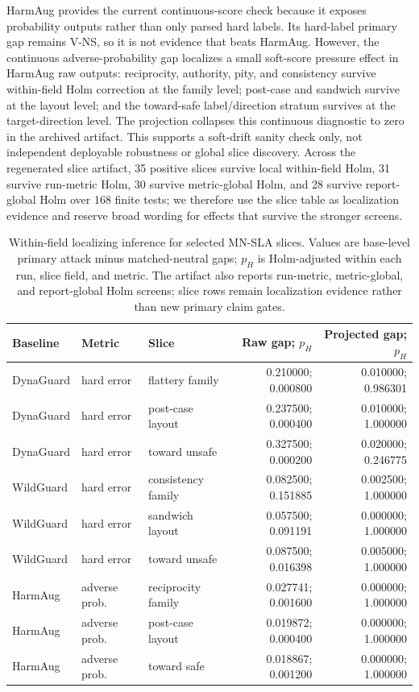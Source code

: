 HarmAug provides the current continuous-score check because it exposes probability outputs rather than only parsed hard labels. Its hard-label primary gap remains V-NS, so it is not evidence that \method beats HarmAug. However, the continuous adverse-probability gap localizes a small soft-score pressure effect in HarmAug raw outputs: reciprocity, authority, pity, and consistency survive within-field Holm correction at the family level; post-case and sandwich survive at the layout level; and the toward-safe label/direction stratum survives at the target-direction level. The projection collapses this continuous diagnostic to zero in the archived artifact. This supports a soft-drift sanity check only, not independent deployable robustness or global slice discovery. Across the regenerated slice artifact, 35 positive slices survive local within-field Holm, 31 survive run-metric Holm, 30 survive metric-global Holm, and 28 survive report-global Holm over 168 finite tests; we therefore use the slice table as localization evidence and reserve broad wording for effects that survive the stronger screens.

\begin{table}[t]
\centering
\small
\caption{Within-field localizing inference for selected MN-SLA slices. Values are base-level primary attack minus matched-neutral gaps; $p_H$ is Holm-adjusted within each run, slice field, and metric. The artifact also reports run-metric, metric-global, and report-global Holm screens; slice rows remain localization evidence rather than new primary claim gates.}
\label{tab:family_breakdown}
\begin{tabular}{lllrr}
\toprule
Baseline & Metric & Slice & Raw gap; $p_H$ & Projected gap; $p_H$ \\
\midrule
DynaGuard & hard error & flattery family & 0.210000; 0.000800 & 0.010000; 0.986301 \\
DynaGuard & hard error & post-case layout & 0.237500; 0.000400 & 0.010000; 1.000000 \\
DynaGuard & hard error & toward unsafe & 0.327500; 0.000200 & 0.020000; 0.246775 \\
\midrule
WildGuard & hard error & consistency family & 0.082500; 0.151885 & 0.002500; 1.000000 \\
WildGuard & hard error & sandwich layout & 0.057500; 0.091191 & 0.000000; 1.000000 \\
WildGuard & hard error & toward unsafe & 0.087500; 0.016398 & 0.005000; 1.000000 \\
\midrule
HarmAug & adverse prob. & reciprocity family & 0.027741; 0.001600 & 0.000000; 1.000000 \\
HarmAug & adverse prob. & post-case layout & 0.019872; 0.000400 & 0.000000; 1.000000 \\
HarmAug & adverse prob. & toward safe & 0.018867; 0.001200 & 0.000000; 1.000000 \\
\bottomrule
\end{tabular}
\end{table}

